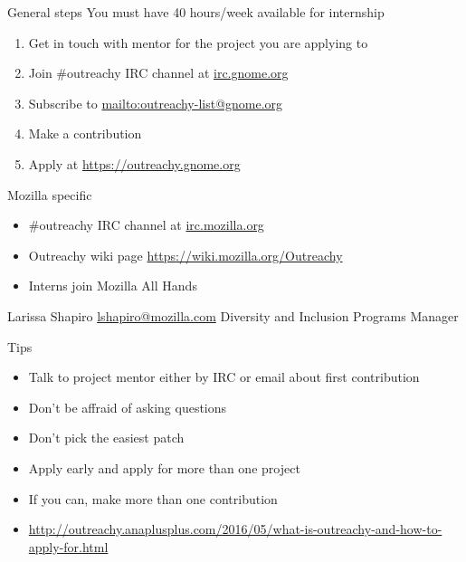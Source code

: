 \documentclass[pdf]{beamer}
\begin{document}
\begin{frame}{General steps}
  You must have 40 hours/week available for internship

  \begin{enumerate}
    \item Get in touch with mentor for the project you are applying to
    \item Join \#outreachy IRC channel at \url{irc.gnome.org}
    \item Subscribe to \url{mailto:outreachy-list@gnome.org}
    \item Make a contribution
    \item Apply at \url{https://outreachy.gnome.org}
  \end{enumerate}
\end{frame}

\begin{frame}{Mozilla specific}
  \begin{itemize}
    \item \#outreachy IRC channel at \url{irc.mozilla.org}
    \item Outreachy wiki page \url{https://wiki.mozilla.org/Outreachy}
    \item Interns join Mozilla All Hands
  \end{itemize}

  \begin{center}
    Larissa Shapiro \href{mailto:lshapiro@mozilla.com}{lshapiro@mozilla.com}
    Diversity and Inclusion Programs Manager
  \end{center}
\end{frame}

\begin{frame}{Tips}
  \begin{itemize}
    \item Talk to project mentor either by IRC or email about first contribution
    \item Don't be affraid of asking questions
    \item Don't pick the easiest patch
    \item Apply early and apply for more than one project
    \item If you can, make more than one contribution
    \item \url{http://outreachy.anaplusplus.com/2016/05/what-is-outreachy-and-how-to-apply-for.html}
  \end{itemize}
\end{frame}
\end{document}
